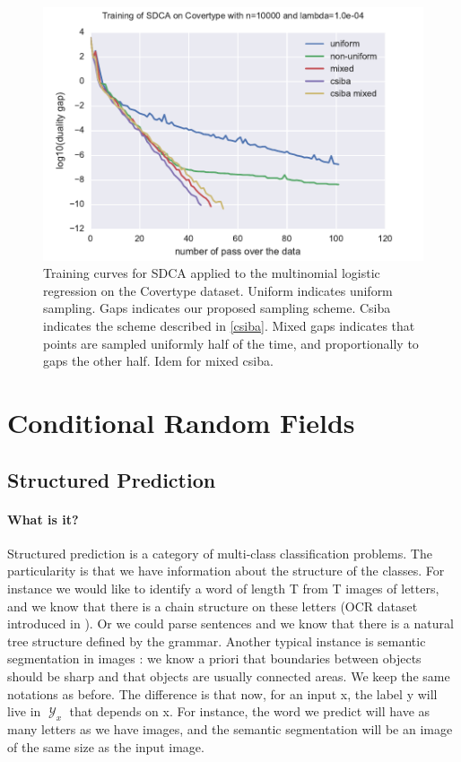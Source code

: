 \documentclass{article}
\DeclareMathOperator{\1}{\mathbb{1}}
\DeclareMathOperator{\Y}{\mathcal{Y}}
\begin{document}
\begin{figure}[ht]
	\label{training covertype}
	\center
	\includegraphics[width=.8\textwidth]{images/20170914_065817_covertype_perf.pdf}
	\caption{Training curves for SDCA applied to the multinomial logistic regression on the Covertype dataset. Uniform indicates uniform sampling. Gaps indicates our proposed sampling scheme. Csiba indicates the scheme described in \ref{csiba}. Mixed gaps indicates that points are sampled uniformly half of the time, and proportionally to gaps the other half. Idem for mixed csiba.}
\end{figure}

\clearpage
\section{Conditional Random Fields}

\subsection{Structured Prediction}

\paragraph{What is it?}
Structured prediction is a category of multi-class classification problems.
The particularity is that we have information about the structure of the classes.
For instance we would like to identify a word of length T from T images of letters, and we know that there is a chain structure on these letters (OCR dataset introduced in \cite{taskar_max-margin_2004}).
Or we could parse sentences and we know that there is a natural tree structure defined by the grammar.
Another typical instance is semantic segmentation in images : we know a priori that boundaries between objects should be sharp and that objects are usually connected areas.
We keep the same notations as before.
The difference is that now, for an input x, the label y will live in $\Y_x$ that depends on x.
For instance, the word we predict will have as many letters as we have images, and the semantic segmentation will be an image of the same size as the input image. 
\end{document}
